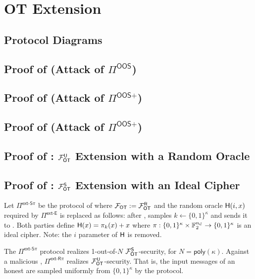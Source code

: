 
\section{OT Extension }\label{sec:extApp}



\subsection{Protocol Diagrams}




\subsection{Proof of  (Attack of $\Pi^\textsf{OOS}$)}



\subsection{Proof of  (Attack of $\Pi^\textsf{OOS+}$)}



\subsection{Proof of  (Attack of $\Pi^\textsf{OOS+}$)}


\subsection{Proof of : $\mathcal{F}_{\mathsf{OT}}^\mathsf{U}$ Extension with a Random Oracle}



\subsection{Proof of : $\mathcal{F}_{\mathsf{OT}}^\mathsf{S}$ Extension with an Ideal Cipher}



\begin{definition}\label{def:ext_R_S}
	Let $\Pi^{\textsf{ext-S}\pi}$ be the protocol of  where $\mathcal{F}_{\mathsf{OT}}:=\mathcal{F}_{\mathsf{OT}}^\mathsf{R}$ and the random oracle $\mathsf{H}(i,x)$ required by $\Pi^{\textsf{ext-E}}$ is replaced as follows: after , \send samples $k\gets\{0,1\}^{\kappa}$ and sends it to \rec. Both parties define $\mathsf{H}(x)=\pi_k(x)+x$ where $\pi:\{0,1\}^{\kappa} \times \mathbb{F}^{{n_\mathcal{C}}}_2 \rightarrow\{0,1\}^\kappa$ is an ideal cipher. Note: the $i$ parameter of $\mathsf{H}$ is removed.
\end{definition}
\begin{lemma}\label{lem:ext_R_S}
	The $\Pi^{\textsf{ext-S}\pi}$ protocol realizes 1-out-of-$N$ $\mathcal{F}_{\mathsf{OT}}^\mathsf{S}$-security, for $N=\textsf{poly}(\kappa)$. Against a malicious \rec,  $\Pi^{\textsf{ext-R}\pi}$ realizes $\mathcal{F}_{\mathsf{OT}}^\mathsf{U}$-security. That is, the input messages of an honest \send are sampled uniformly from $\{0,1\}^\kappa$ by the protocol.
\end{lemma}

